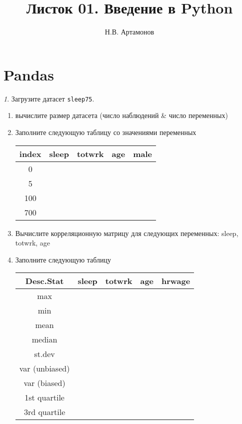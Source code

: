 \documentclass[12pt]{article}
\title{Листок 01. Введение в Python}
\author{Н.В. Артамонов}
\theoremstyle{remark}
\newtheorem{exercise}{}[section]
\begin{document}
\maketitle

\tableofcontents

\section{Pandas}

\begin{exercise}
Загрузите датасет \texttt{sleep75}.
\begin{enumerate}
	\item вычислите размер датасета (число наблюдений \& число переменных)
	\item Заполните следующую таблицу со значениями переменных
	\begin{center}
		\begin{tabular}{|c|c|c|c|c|} \hline
			index & sleep & totwrk & age & male\\ \hline\hline
			0 & & & & \\ \hline
			5 & & & & \\ \hline
			100 & & & & \\ \hline
			700 & & & & \\ \hline
		\end{tabular}
	\end{center}
	\item Вычислите корреляционную матрицу для следующих переменных: sleep, totwrk, age 
	\item Заполните следующую таблицу
	\begin{center}
		\begin{tabular}{|c|c|c|c|c|} \hline
			Desc.Stat & sleep & totwrk & age & hrwage\\ \hline\hline
			max & & & & \\ \hline
			min & & & & \\ \hline
			mean & & & & \\ \hline
			median & & & & \\ \hline
			st.dev & & & & \\ \hline
			var (unbiased) & & & & \\ \hline
			var (biased) & & & & \\ \hline
			1st quartile & & & & \\ \hline
			3rd quartile & & & & \\ \hline
		\end{tabular}
	\end{center}

\end{enumerate}
\end{exercise}
\end{document}
